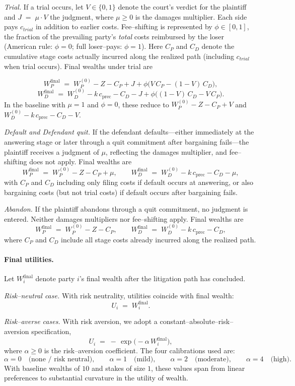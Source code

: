 \documentclass{article}
\begin{document}
\emph{Trial.} If a trial occurs, let $V\in\{0,1\}$ denote the court’s verdict for the plaintiff and $J \;=\; \mu \cdot V$ the judgment, where $\mu\ge 0$ is the damages multiplier. Each side pays $c_{trial}$ in addition to earlier costs. Fee–shifting is represented by $\phi\in[0,1]$, the fraction of the prevailing party’s \emph{total} costs reimbursed by the loser (American rule: $\phi=0$; full loser–pays: $\phi=1$). Here $C_P$ and $C_D$ denote the cumulative stage costs actually incurred along the realized path (including $c_{trial}$ when trial occurs). Final wealths under trial are

\[
W_P^{\mathrm{final}}
\;=\;
W_P^{(0)} - Z - C_P + J + \phi\bigl(V\,C_P - (1-V)\,C_D\bigr),
\]
\[
W_D^{\mathrm{final}}
\;=\;
W_D^{(0)} - k\,c_{\mathrm{prec}} - C_D - J + \phi\bigl((1-V)\,C_D - V\,C_P\bigr).
\]
In the baseline with $\mu=1$ and $\phi=0$, these reduce to $W_P^{(0)}-Z-C_P+V$ and $W_D^{(0)}-k\,c_{\mathrm{prec}}-C_D-V$.

\emph{Default and Defendant quit.} If the defendant defaults—either immediately at the answering stage or later through a quit commitment after bargaining fails—the plaintiff receives a judgment of $\mu$, reflecting the damages multiplier, and fee–shifting does not apply. Final wealths are
\[
W_P^{\mathrm{final}} \;=\; W_P^{(0)} - Z - C_P + \mu,
\qquad
W_D^{\mathrm{final}} \;=\; W_D^{(0)} - k\,c_{\mathrm{prec}} - C_D - \mu,
\]
with $C_P$ and $C_D$ including only filing costs if default occurs at answering, or also bargaining costs (but not trial costs) if default occurs after bargaining fails.

\emph{Abandon.} If the plaintiff abandons through a quit commitment, no judgment is entered. Neither damages multipliers nor fee–shifting apply. Final wealths are
\[
W_P^{\mathrm{final}} \;=\; W_P^{(0)} - Z - C_P,
\qquad
W_D^{\mathrm{final}} \;=\; W_D^{(0)} - k\,c_{\mathrm{prec}} - C_D,
\]
where $C_P$ and $C_D$ include all stage costs already incurred along the realized path.

\paragraph{Final utilities.}
Let $W_i^{\mathrm{final}}$ denote party $i$'s final wealth after the litigation path has concluded.

\emph{Risk–neutral case.} With risk neutrality, utilities coincide with final wealth:
\[
U_i \;=\; W_i^{\mathrm{final}}.
\]

\emph{Risk–averse cases.} With risk aversion, we adopt a constant–absolute–risk–aversion specification,
\[
U_i \;=\; -\,\exp\!\bigl(-\alpha\,W_i^{\mathrm{final}}\bigr),
\]
where $\alpha\ge 0$ is the risk–aversion coefficient. The four calibrations used are:
\[
\alpha = 0 \quad\text{(none / risk neutral)},\qquad
\alpha = 1 \quad\text{(mild)},\qquad
\alpha = 2 \quad\text{(moderate)},\qquad
\alpha = 4 \quad\text{(high)}.
\]
With baseline wealths of $10$ and stakes of size $1$, these values span from linear preferences to substantial curvature in the utility of wealth.
\end{document}
